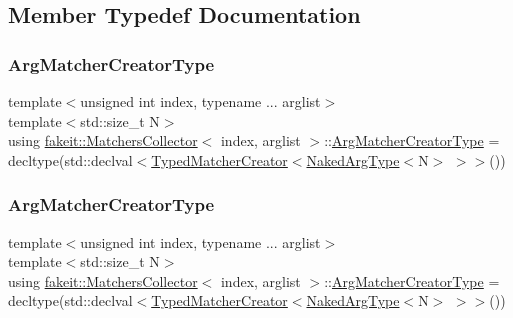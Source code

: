 \subsection{Member Typedef Documentation}
\mbox{\label{classfakeit_1_1MatchersCollector_a1b9d32a66882e0559e7072f1db88eee3}} 
\subsubsection{\texorpdfstring{ArgMatcherCreatorType}{ArgMatcherCreatorType}\hspace{0.1cm}{\footnotesize\ttfamily [1/9]}}
{\footnotesize\ttfamily template$<$unsigned int index, typename ... arglist$>$ \\
template$<$std\+::size\+\_\+t N$>$ \\
using \mbox{\hyperlink{classfakeit_1_1MatchersCollector}{fakeit\+::\+Matchers\+Collector}}$<$ index, arglist $>$\+::\mbox{\hyperlink{classfakeit_1_1MatchersCollector_a1b9d32a66882e0559e7072f1db88eee3}{Arg\+Matcher\+Creator\+Type}} =  decltype(std\+::declval$<$\mbox{\hyperlink{structfakeit_1_1TypedMatcherCreator}{Typed\+Matcher\+Creator}}$<$\mbox{\hyperlink{classfakeit_1_1MatchersCollector_aeda8ced6a2f0cb7c6e4f916f18a91730}{Naked\+Arg\+Type}}$<$N$>$ $>$$>$())}

\mbox{\label{classfakeit_1_1MatchersCollector_a1b9d32a66882e0559e7072f1db88eee3}} 
\subsubsection{\texorpdfstring{ArgMatcherCreatorType}{ArgMatcherCreatorType}\hspace{0.1cm}{\footnotesize\ttfamily [2/9]}}
{\footnotesize\ttfamily template$<$unsigned int index, typename ... arglist$>$ \\
template$<$std\+::size\+\_\+t N$>$ \\
using \mbox{\hyperlink{classfakeit_1_1MatchersCollector}{fakeit\+::\+Matchers\+Collector}}$<$ index, arglist $>$\+::\mbox{\hyperlink{classfakeit_1_1MatchersCollector_a1b9d32a66882e0559e7072f1db88eee3}{Arg\+Matcher\+Creator\+Type}} =  decltype(std\+::declval$<$\mbox{\hyperlink{structfakeit_1_1TypedMatcherCreator}{Typed\+Matcher\+Creator}}$<$\mbox{\hyperlink{classfakeit_1_1MatchersCollector_aeda8ced6a2f0cb7c6e4f916f18a91730}{Naked\+Arg\+Type}}$<$N$>$ $>$$>$())}

